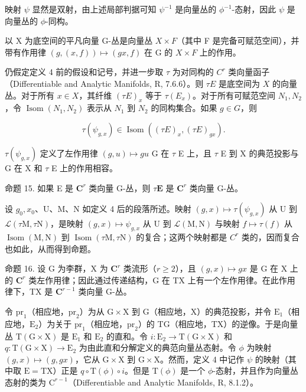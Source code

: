 映射 \(\psi\) 显然是双射，由上述局部判据可知 \(\psi^{-1}\) 是向量丛的 \(\phi^{-1}\)-态射，因此 \(\psi\) 是向量丛的 \(\phi\)-同构。

以 X 为底空间的平凡向量 G-丛是向量丛 \(X \times F\)（其中 F 是完备可赋范空间），并带有作用律 \((g, (x, f)) \mapsto (gx, f)\) 在 G 的 \(X \times F\) 上的作用。

仍假定定义 4 前的假设和记号，并进一步取 \(\tau\) 为对同构的 \(C^r\) 类向量函子（Differentiable and Analytic Manifolds, R, 7.6.6）。则 \(\tau E\) 是底空间为 \(X\) 的向量丛。对于所有 \(x \in X\)，其纤维 \((\tau E)_x\) 等于 \(\tau (E_x)\)。对于所有可赋范空间 \(N_1, N_2\)，令 \(\operatorname{Isom}(N_1, N_2)\) 表示从 \(N_1\) 到 \(N_2\) 的同构集合。如果 \(g \in G\)，则

\[
\tau (\psi_ {g, x}) \in \operatorname{Isom} ((\tau E) _ {x}, (\tau E) _ {g x}).
\]

\(\tau(\psi_{g,x})\) 定义了左作用律 \((g,u)\mapsto gu\) G 在 \(\tau\) E 上，且 \(\tau\) E 到 X 的典范投影与 G 在 X 和 \(\tau\) E 上的作用相容。

命题 15. 如果 E 是 \(\mathbf{C}^r\) 类向量 G-丛，则 \(\tau \mathbf{E}\) 是 \(\mathbf{C}^r\) 类向量 G-丛。

设 \(g_0, x_0\)、U、M、N 如定义 4 后的段落所述。映射 \((g, x) \mapsto \tau(\psi_{g,x})\) 从 U 到 \(\mathcal{L}(\tau\mathrm{M}, \tau\mathrm{N})\)，是映射 \((g, x) \mapsto \psi_{g,x}\) 从 U 到 \(\mathcal{L}(\mathrm{M}, \mathrm{N})\) 与映射 \(f \mapsto \tau(f)\) 从 \(\operatorname{Isom}(\mathrm{M}, \mathrm{N})\) 到 \(\operatorname{Isom}(\tau\mathrm{M}, \tau\mathrm{N})\) 的复合；这两个映射都是 \(C^r\) 类的，因而复合也如此，从而得到命题。

命题 16. 设 G 为李群，X 为 \(\mathbf{C}^r\) 类流形（\(r \geqslant 2\)），且 \((g, x) \mapsto gx\) 是 G 在 X 上的 \(\mathbf{C}^r\) 类左作用律；因此通过传递结构，G 在 TX 上有一个左作用律。在此作用律下，TX 是 \(\mathbf{C}^{r-1}\) 类向量 G-丛。

令 \(\mathrm{pr}_1\)（相应地，\(\mathrm{pr}_2\)）为从 \(\mathrm{G} \times \mathrm{X}\) 到 \(\mathrm{G}\)（相应地，\(\mathrm{X}\)）的典范投影，并令 \(\mathrm{E}_1\)（相应地，\(\mathrm{E}_2\)）为关于 \(\mathrm{pr}_1\)（相应地，\(\mathrm{pr}_2\)）的 TG（相应地，TX）的逆像。于是向量丛 \(\mathrm{T}(\mathrm{G} \times \mathrm{X})\) 是 \(\mathrm{E}_1\) 和 \(\mathrm{E}_2\) 的直和。令 \(i: \mathrm{E}_2 \to \mathrm{T}(\mathrm{G} \times \mathrm{X})\) 和 \(q: \mathrm{T}(\mathrm{G} \times \mathrm{X}) \to \mathrm{E}_2\) 为由此直和分解定义的典范向量丛态射。令 \(\phi\) 为映射 \((g, x) \mapsto (g, gx)\)，它从 \(\mathrm{G} \times \mathrm{X}\) 到 \(\mathrm{G} \times \mathrm{X}\)。然而，定义 4 中记作 \(\psi\) 的映射（其中取 \(\mathrm{E} = \mathrm{TX}\)）正是 \(q \circ \mathrm{T}(\phi) \circ i\)。但是 \(\mathrm{T}(\phi)\) 是一个 \(\phi\)-态射，并且作为向量丛态射的类为 \(\mathrm{C}^{r-1}\)（Differentiable and Analytic Manifolds, R, 8.1.2）。

